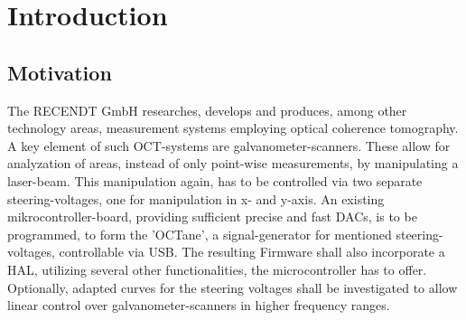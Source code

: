 \chapter{Introduction}
\label{cha:Introduction}


\section{Motivation}
The RECENDT GmbH researches, develops and produces, among other technology areas, measurement systems employing optical coherence tomography. A key element of such OCT-systems are galvanometer-scanners.  These allow for analyzation of areas, instead of only point-wise measurements, by manipulating a laser-beam. This manipulation again, has to be controlled via two separate steering-voltages, one for manipulation in x- and y-axis. An existing mikrocontroller-board, providing sufficient precise and fast DACs, is to be programmed, to form the 'OCTane', a signal-generator for mentioned steering-voltages, controllable via USB. The resulting Firmware shall also incorporate a HAL, utilizing several other functionalities, the microcontroller has to offer. Optionally, adapted curves for the steering voltages shall be investigated to allow linear control over galvanometer-scanners in higher frequency ranges.

